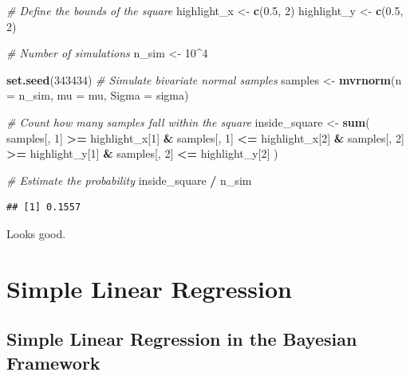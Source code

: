 \documentclass[
]{book}
\newenvironment{Shaded}{\begin{snugshade}}{\end{snugshade}}
\newcommand{\AttributeTok}[1]{\textcolor[rgb]{0.13,0.29,0.53}{#1}}
\newcommand{\CommentTok}[1]{\textcolor[rgb]{0.56,0.35,0.01}{\textit{#1}}}
\newcommand{\DecValTok}[1]{\textcolor[rgb]{0.00,0.00,0.81}{#1}}
\newcommand{\FloatTok}[1]{\textcolor[rgb]{0.00,0.00,0.81}{#1}}
\newcommand{\FunctionTok}[1]{\textcolor[rgb]{0.13,0.29,0.53}{\textbf{#1}}}
\newcommand{\NormalTok}[1]{#1}
\newcommand{\OtherTok}[1]{\textcolor[rgb]{0.56,0.35,0.01}{#1}}
\newcommand{\SpecialCharTok}[1]{\textcolor[rgb]{0.81,0.36,0.00}{\textbf{#1}}}
\begin{document}
\begin{Shaded}
\begin{Highlighting}[]
\CommentTok{\# Define the bounds of the square}
\NormalTok{highlight\_x }\OtherTok{\textless{}{-}} \FunctionTok{c}\NormalTok{(}\FloatTok{0.5}\NormalTok{, }\DecValTok{2}\NormalTok{)}
\NormalTok{highlight\_y }\OtherTok{\textless{}{-}} \FunctionTok{c}\NormalTok{(}\FloatTok{0.5}\NormalTok{, }\DecValTok{2}\NormalTok{)}

\CommentTok{\# Number of simulations}
\NormalTok{n\_sim }\OtherTok{\textless{}{-}} \DecValTok{10}\SpecialCharTok{\^{}}\DecValTok{4}

\FunctionTok{set.seed}\NormalTok{(}\DecValTok{343434}\NormalTok{)}
\CommentTok{\# Simulate bivariate normal samples}
\NormalTok{samples }\OtherTok{\textless{}{-}} \FunctionTok{mvrnorm}\NormalTok{(}\AttributeTok{n =}\NormalTok{ n\_sim, }\AttributeTok{mu =}\NormalTok{ mu, }\AttributeTok{Sigma =}\NormalTok{ sigma)}

\CommentTok{\# Count how many samples fall within the square}
\NormalTok{inside\_square }\OtherTok{\textless{}{-}} \FunctionTok{sum}\NormalTok{(}
\NormalTok{  samples[, }\DecValTok{1}\NormalTok{] }\SpecialCharTok{\textgreater{}=}\NormalTok{ highlight\_x[}\DecValTok{1}\NormalTok{] }\SpecialCharTok{\&}\NormalTok{ samples[, }\DecValTok{1}\NormalTok{] }\SpecialCharTok{\textless{}=}\NormalTok{ highlight\_x[}\DecValTok{2}\NormalTok{] }\SpecialCharTok{\&}
\NormalTok{  samples[, }\DecValTok{2}\NormalTok{] }\SpecialCharTok{\textgreater{}=}\NormalTok{ highlight\_y[}\DecValTok{1}\NormalTok{] }\SpecialCharTok{\&}\NormalTok{ samples[, }\DecValTok{2}\NormalTok{] }\SpecialCharTok{\textless{}=}\NormalTok{ highlight\_y[}\DecValTok{2}\NormalTok{]}
\NormalTok{)}

\CommentTok{\# Estimate the probability}
\NormalTok{inside\_square }\SpecialCharTok{/}\NormalTok{ n\_sim}
\end{Highlighting}
\end{Shaded}

\begin{verbatim}
## [1] 0.1557
\end{verbatim}

Looks good.

\chapter{Simple Linear Regression}\label{simple-linear-regression}

\section{Simple Linear Regression in the Bayesian Framework}\label{simple_lin_reg_bayes}
\end{document}
